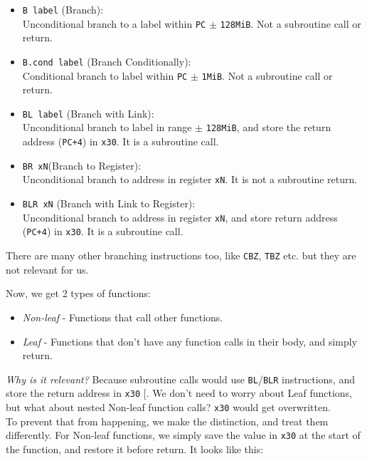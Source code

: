 \documentclass[a4paper, nobind]{templates/ociamthesis}
\providecommand{\tightlist}{%
  \setlength{\itemsep}{0pt}\setlength{\parskip}{0pt}}
\begin{document}
\begin{itemize}
\tightlist
\item
  \texttt{B\ label} (Branch):\\
  Unconditional branch to a label within \texttt{PC} \(\pm\) \texttt{128MiB}.
  Not a subroutine call or return.
\item
  \texttt{B.cond\ label} (Branch Conditionally):\\
  Conditional branch to label within \texttt{PC} \(\pm\) \texttt{1MiB}.
  Not a subroutine call or return.
\item
  \texttt{BL\ label} (Branch with Link):\\
  Unconditional branch to label in range \(\pm\) \texttt{128MiB},
  and store the return address (\texttt{PC+4}) in \texttt{x30}.
  It is a subroutine call.
\item
  \texttt{BR\ xN}(Branch to Register):\\
  Unconditional branch to address in register \texttt{xN}.
  It is not a subroutine return.
\item
  \texttt{BLR\ xN} (Branch with Link to Register):\\
  Unconditional branch to address in register \texttt{xN},
  and store return address (\texttt{PC+4}) in \texttt{x30}.
  It is a subroutine call.
\end{itemize}

There are many other branching instructions too, like \texttt{CBZ}, \texttt{TBZ} etc.
but they are not relevant for us.

Now, we get 2 types of functions:

\begin{itemize}
\tightlist
\item
  \emph{Non-leaf} - Functions that call other functions.
\item
  \emph{Leaf} - Functions that don't have any function calls in their body, and simply return.
\end{itemize}

\emph{Why is it relevant?}
Because subroutine calls would use \texttt{BL}/\texttt{BLR} instructions,
and store the return address in \texttt{x30} {[}\citeproc{ref-arm-arch-manual}{11}{]}.
We don't need to worry about Leaf functions,
but what about nested Non-leaf function calls? \texttt{x30} would get overwritten.\\
To prevent that from happening, we make the distinction, and treat them differently.
For Non-leaf functions, we simply save the value in \texttt{x30} at the start of the function,
and restore it before return. It looks like this:
\end{document}
